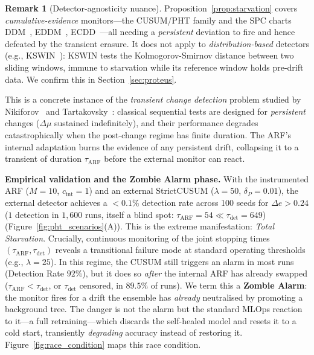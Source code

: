 \documentclass[10pt,conference]{IEEEtran}
\theoremstyle{definition}
\newtheorem{remark}[theorem]{Remark}
\begin{document}
\begin{remark}[Detector-agnosticity nuance]\label{rem:agnostic}
  Proposition~\ref{prop:starvation} covers \emph{cumulative-evidence} monitors---the CUSUM/PHT family and the SPC charts DDM~\cite{gama_ddm_2004}, EDDM~\cite{baena_eddm_2006}, ECDD~\cite{ross_ecdd_2012}---all needing a \emph{persistent} deviation to fire and hence defeated by the transient erasure. It does not apply to \emph{distribution-based} detectors (e.g., KSWIN~\cite{raab_kswin_2020}): KSWIN tests the Kolmogorov-Smirnov distance between two sliding windows, immune to starvation while its reference window holds pre-drift data. We confirm this in Section~\ref{sec:proteus}.
\end{remark}

This is a concrete instance of the \emph{transient change detection} problem studied by Nikiforov~\cite{nikiforov_2012} and Tartakovsky~\cite{tartakovsky_2023_transient}: classical sequential tests are designed for \emph{persistent} changes ($\Delta\mu$ sustained indefinitely), and their performance degrades catastrophically when the post-change regime has finite duration.
The ARF's internal adaptation burns the evidence of any persistent drift, collapsing it to a transient of duration $\tau_{\mathrm{ARF}}$ before the external monitor can react.

\textbf{Empirical validation and the Zombie Alarm phase.}
With the instrumented ARF ($M = 10$, $c_{\mathrm{int}} = 1$) and an external StrictCUSUM ($\lambda = 50$, $\delta_P = 0.01$), the external detector achieves a ${<}0.1\%$ detection rate across 100 seeds for $\Delta e > 0.24$ ($1$ detection in $1{,}600$ runs, itself a blind spot: $\tau_{\mathrm{ARF}} = 54 \ll \tau_{\mathrm{det}} = 649$) (Figure~\ref{fig:pht_scenarios}(A)). This is the extreme manifestation: \emph{Total Starvation}.
Crucially, continuous monitoring of the joint stopping times $(\tau_{\mathrm{ARF}}, \tau_{\mathrm{det}})$ reveals a transitional failure mode at standard operating thresholds (e.g., $\lambda = 25$). In this regime, the CUSUM still triggers an alarm in most runs (Detection Rate $92\%$), but it does so \emph{after} the internal ARF has already swapped ($\tau_{\mathrm{ARF}} < \tau_{\mathrm{det}}$, or $\tau_{\mathrm{det}}$ censored, in $89.5\%$ of runs). We term this a \textbf{Zombie Alarm}: the monitor fires for a drift the ensemble has \emph{already} neutralised by promoting a background tree. The danger is not the alarm but the standard MLOps reaction to it---a full retraining---which discards the self-healed model and resets it to a cold start, transiently \emph{degrading} accuracy instead of restoring it. Figure~\ref{fig:race_condition} maps this race condition.
\end{document}
